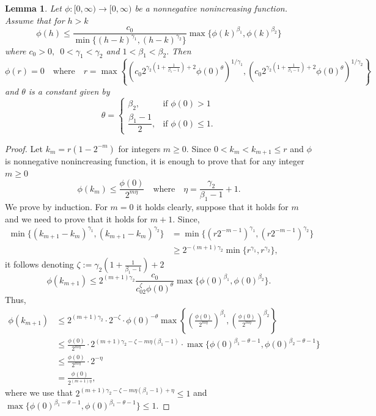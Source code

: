 \documentclass[11pt, leqno]{article}
\newtheorem{lemma}[theorem]{Lemma}
\theoremstyle{definition}
\theoremstyle{remark}
\numberwithin{equation}{section}
\begin{document}
\begin{lemma}\label{lemaux}
    Let $\phi:[0,\infty)\to [0,\infty)$ be a nonnegative nonincreasing function.
    Assume that for $h>k$
    $$\phi(h)\leq \frac{c_0}{\min\{(h-k)^{\gamma_1},(h-k)^{\gamma_2}\}}\max\{\phi(k)^{\beta_1},\phi(k)^{\beta_2}\}  $$
    where $c_0>0,\,\,\,0<\gamma_1<\gamma_2$ and $1<\beta_1<\beta_2.$
    Then
   $$\phi(r)=0\quad\text{where}\quad r=\max\left\{ \left(c_0 2^{\gamma_2(1+\frac{1}{\beta_1-1})+2}\phi(0)^\theta\right)^{1/\gamma_1}, \left(c_0 2^{\gamma_2(1+\frac{1}{\beta_1-1})+2}\phi(0)^\theta\right)^{1/\gamma_2} \right\}$$
   and $\theta$ is a constant given by
    $$\theta=
   \begin{cases}
    \beta_2, & \text{if } \phi(0) > 1 \\
    \dfrac{\beta_1-1}{2}, & \text{if } \phi(0) \leq 1.
   \end{cases}
    $$
\end{lemma}

\begin{proof}
   Let $k_m=r\left(1-2^{-m}\right)$ for integers $m\geq 0.$ Since $0<k_m<k_{m+1}\leq r$ and $\phi$ is nonnegative nonincreasing function, it is enough to prove that for any integer $m\geq 0$ 
   $$\phi(k_m)\leq \frac{\phi(0)}{2^{m\eta}}\quad\text{where}\quad \eta=\frac{\gamma_2}{\beta_1-1}+1.  $$
   We prove by induction. For $m=0$ it holds clearly, suppose that it holds
 for $m$ and we need to prove that it holds for $m + 1.$ 
 Since,
  \begin{align*}
      \min\{(k_{m+1}-k_m)^{\gamma_1}, (k_{m+1}-k_m)^{\gamma_2}\} &= \min\{(r2^{-m-1})^{\gamma_1}, (r2^{-m-1})^{\gamma_2}\}\\
      &\geq 2^{-(m+1)\gamma_2}\min\{r^{\gamma_1}, r^{\gamma_2}\},
  \end{align*}
 it follows denoting $\zeta:=\gamma_2\left(1+ \frac{1}{\beta_1-1}\right)+2$
 $$\phi(k_{m+1}) \leq 2^{(m+1)\gamma_2}\frac{c_0}{c_02^\zeta\phi(0)^\theta}\max\{\phi(0)^{\beta_1},\phi(0)^{\beta_2}\}.$$
 Thus,
 \begin{align*}
     \phi(k_{m+1}) &\leq 2^{(m+1)\gamma_2}\cdot 2^{-\zeta}\cdot\phi(0)^{-\theta}\max\left\{\left(\frac{\phi(0)}{2^{m\eta}}\right)^{\beta_1}, \left(\frac{\phi(0)}{2^{m\eta}}\right)^{\beta_2}\right\}\\
     &\leq \frac{\phi(0)}{2^{m\eta}}\cdot 2^{(m+1)\gamma_2-\zeta-m\eta(\beta_1-1)}\cdot\max\{\phi(0)^{\beta_1-\theta-1}, \phi(0)^{\beta_2-\theta-1}\}\\
     &\leq \frac{\phi(0)}{2^{m\eta}}\cdot 2^{-\eta}\\
     &= \frac{\phi(0)}{2^{(m+1)\eta}},
 \end{align*}
 where we use that $2^{(m+1)\gamma_2-\zeta-m\eta(\beta_1-1)+\eta}\leq 1$ and $\max\{\phi(0)^{\beta_1-\theta-1}, \phi(0)^{\beta_1-\theta-1}\}\leq 1.$
\end{proof}
\end{document}
